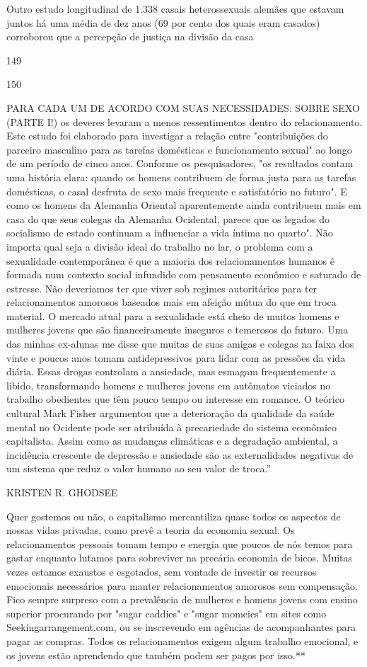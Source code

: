  \par 
Outro estudo longitudinal de {\color{blue}1}.{\color{blue}338} casais heterossexuais alemães que estavam juntos há uma média de dez anos (69 por cento dos quais eram casados) corroborou que a percepção de justiça na divisão da casa
 \par 
149
 \par 
150
 \par 
PARA CADA UM DE ACORDO COM SUAS NECESSIDADES: SOBRE SEXO (PARTE I!) os deveres levaram a menos ressentimentos dentro do relacionamento. Este estudo foi elaborado para investigar a relação entre "contribuições do parceiro masculino para as tarefas domésticas e funcionamento sexual" ao longo de um período de cinco anos. Conforme os pesquisadores, "os resultados contam uma história clara: quando os homens contribuem de forma justa para as tarefas domésticas, o casal desfruta de sexo mais frequente e satisfatório no futuro". E como os homens da Alemanha Oriental aparentemente ainda contribuem mais em casa do que seus colegas da Alemanha Ocidental, parece que os legados do socialismo de estado continuam a influenciar a vida íntima no quarto". Não importa qual seja a divisão ideal do trabalho no lar, o problema com a sexualidade contemporânea é que a maioria dos relacionamentos humanos é formada num contexto social infundido com pensamento econômico e saturado de estresse. Não deveríamos ter que viver sob regimes autoritários para ter relacionamentos amorosos baseados mais em afeição mútua do que em troca material. O mercado atual para a sexualidade está cheio de muitos homens e mulheres jovens que são financeiramente inseguros e temerosos do futuro. Uma das minhas ex-alunas me disse que muitas de suas amigas e colegas na faixa dos vinte e poucos anos tomam antidepressivos para lidar com as pressões da vida diária. Essas drogas controlam a ansiedade, mas esmagam frequentemente a libido, transformando homens e mulheres jovens em autômatos viciados no trabalho obedientes que têm pouco tempo ou interesse em romance. O teórico cultural Mark Fisher argumentou que a deterioração da qualidade da saúde mental no Ocidente pode ser atribuída à precariedade do sistema econômico capitalista. Assim como as mudanças climáticas e a degradação ambiental, a incidência crescente de depressão e ansiedade são as externalidades negativas de um sistema que reduz o valor humano ao seu valor de troca.”
 \par 
KRISTEN R. GHODSEE
 \par 
Quer gostemos ou não, o capitalismo mercantiliza quase todos os aspectos de nossas vidas privadas, como prevê a teoria da economia sexual. Os relacionamentos pessoais tomam tempo e energia que poucos de nós temos para gastar enquanto lutamos para sobreviver na precária economia de bicos. Muitas vezes estamos exaustos e esgotados, sem vontade de investir os recursos emocionais necessários para manter relacionamentos amorosos sem compensação. Fico sempre surpreso com a prevalência de mulheres e homens jovens com ensino superior procurando por "sugar caddies" e "sugar momeies" em sites como Seekingarrangement.com, ou se inscrevendo em agências de acompanhantes para pagar as compras. Todos os relacionamentos exigem algum trabalho emocional, e os jovens estão aprendendo que também podem ser pagos por isso.**
